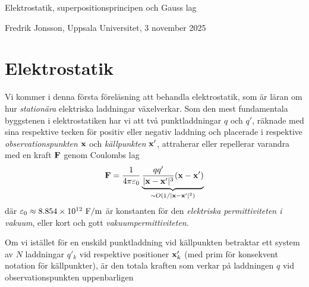 \centerline{\twelvesc Elektrostatik, superpositionsprincipen och Gauss lag}
\centerline{Fredrik Jonsson, Uppsala Universitet, 3 november 2025}
\vskip24pt

\section{Elektrostatik}
Vi kommer i denna f{\"o}rsta f{\"o}rel{\"a}sning
att behandla  elektrostatik, som {\"a}r l{\"a}ran om hur {\it station{\"a}ra}
elektriska laddningar v{\"a}xelverkar.
Som den mest fundamentala byggstenen i elektrostatiken har vi att tv{\aa} punktladdningar $q$ och $q'$, r{\"a}knade med sina respektive tecken f{\"o}r positiv eller negativ laddning och placerade i respektive {\it observationspunkten} ${\bf x}$ och {\it k{\"a}llpunkten} ${\bf x}'$, attraherar eller repellerar varandra med en kraft ${\bf F}$ genom Coulombs lag
$$
  {\bf F}={{1}\over{4\pi\varepsilon_0}}\underbrace{
     {{q q'}\over{|{\bf x}-{\bf x}'|^3}}({\bf x}-{\bf x}')
  }_{\sim O(1/|{\bf x}-{\bf x}'|^2)}
$$
d{\"a}r $\varepsilon_0\approx8.854\times10^{12}\ {\rm F}/{\rm m}$ {\"a}r konstanten f{\"o}r den {\it elektriska permittiviteten i vakuum}, eller kort och gott {\it vakuumpermittiviteten}.
\bigskip\centerline{}
\medskip
\noindent
Om vi ist{\"a}llet f{\"o}r en enskild punktladdning vid k{\"a}llpunkten betraktar ett system av $N$ laddningar $q'_k$ vid respektive positioner ${\bf x}'_k$ (med prim f{\"o}r konsekvent notation f{\"o}r k{\"a}llpunkter), {\"a}r den totala kraften som verkar p{\aa} laddningen $q$ vid observationspunkten uppenbarligen
